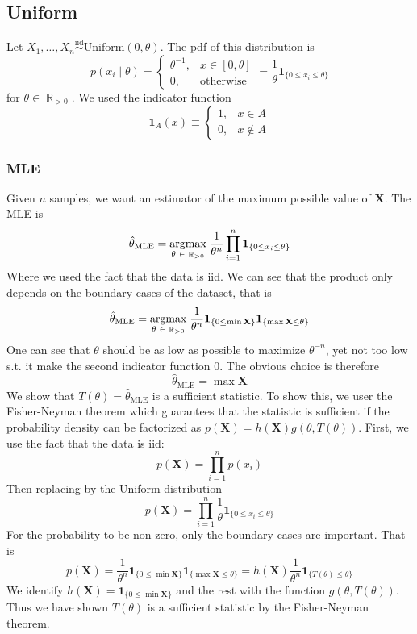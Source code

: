 \documentclass{article}
\DeclareMathOperator{\R}{\mathbb{R}}
\newcommand{\s}{\hspace{0.1cm}}
\numberwithin{equation}{section}
\newcommand{\mle}[1]{\hat{#1}_{\text{MLE}}}
\newcommand{\set}[1]{\{#1\}}
\begin{document}
\subsection{Uniform}
Let $X_1,\dots,X_n \overset{\text{iid}}{\sim }\text{Uniform}(0,\theta) $. The pdf 
of this distribution is 
\[
        p(x_i \mid \theta) = \left\{  
        \begin{array}{rl}
                \theta^{-1},& x \in [0,\theta]\\
                0,& \text{otherwise} 
        \end{array}
\right. 
= \frac{1}{\theta} \bm{ 1}_{\{0 \le x_i \le \theta \}} 
\]
for $\theta \in \R_{>0}$. We used the indicator function 
\[
        \bm{ 1}_A(x) \equiv \left\{ 
        \begin{array}{lr}
                1,& x \in A \\
                0,& x \not\in A
        \end{array}
        \right. 
\]



\subsubsection{MLE}
Given $n$ samples, we want an estimator of the maximum possible value of $\mathbf{X}$.
The MLE is
\[
        \mle{\theta} = \underset{\theta \s \in \s \R_{>0}}{\text{argmax}}
        \s
        \frac{1}{\theta^n}\prod_{i = 1}^n \bm{ 1}_{\set{0 \le x_i \le \theta}} 
\]
Where we used the fact that the data is iid. We can see that the product only depends 
on the boundary cases of the dataset, that is
\[
        \mle{\theta} = \underset{\theta \s \in \s \R_{>0}}{\text{argmax}}
        \s
        \frac{1}{\theta^n}  \bm{ 1}_{\set{0 \le \min \mathbf{X}}} 
        \bm{ 1}_{\set{\max \mathbf{X} \le \theta}}  
\]
One can see that $\theta$ should be as low as possible to maximize $\theta^{-n}$, yet 
not too low s.t. it make the second indicator function 0. The obvious choice is therefore 
\[
        \boxed{\mle{\theta} = \max \mathbf{X}}
\]
We show that $T(\theta) = \mle{\theta}$ is a sufficient statistic.
To show this, we user the Fisher-Neyman theorem which guarantees that the 
statistic is sufficient if
the probability density can be factorized as 
$p(\mathbf{X}) = h(\mathbf{X}) g(\theta, T(\theta))$. First, we use 
the fact that the data is iid:
\[
        p(\mathbf{X}) = \prod_{i = 1}^n p(x_i)
\]
Then replacing by the Uniform distribution
\[
        p(\mathbf{X}) = \prod_{i = 1}^n \frac{1}{\theta}\bm{ 1}_{\{0 \le x_i \le \theta\}} 
\]
For the probability to be non-zero, only the boundary cases are important. That is
\[
p(\mathbf{X}) = \frac{1}{\theta^n} 
\bm{ 1}_{\{0 \le \min \mathbf{X} \}} 
\bm{ 1}_{\{\max \mathbf{X}\le \theta\}} 
= h(\mathbf{X}) \frac{1}{\theta^n} \bm{ 1}_{\{T(\theta) \le \theta\}} 
\]
We identify $h(\mathbf{X}) = \bm{ 1}_{\{0 \le \min\mathbf{X}\}} $ and the rest with the 
function $g(\theta, T(\theta))$. Thus we have shown  $T(\theta)$ is a 
sufficient statistic by the Fisher-Neyman theorem.
\end{document}
